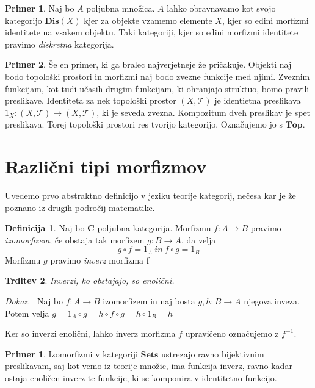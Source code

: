 \documentclass[12pt,a4paper]{book}
\theoremstyle{definition}
\newtheorem{definicija}{Definicija}[chapter]
\theoremstyle{plain}
\newtheorem{trditev}[definicija]{Trditev}
\newenvironment{dokaz}{\emph{Dokaz.}\ }{\hspace{\fill}{$\Box$}}
\theoremstyle{definition}
\newtheorem{primer}{Primer}[section]
\newtheorem*{primer*}{Primer}
\theoremstyle{remark}
\newcommand{\cat}[1]{\textbf{#1}}
\begin{document}
\begin{primer}
Naj bo $A$ poljubna množica. $A$ lahko obravnavamo kot svojo kategorijo $\cat{Dis}(X)$ kjer za objekte vzamemo elemente $X$, kjer so edini morfizmi identitete na vsakem objektu. Taki kategoriji, kjer so edini morfizmi identitete pravimo \emph{diskretna} kategorija.
\end{primer}

\begin{primer}
Še en primer, ki ga bralec najverjetneje že pričakuje. Objekti naj bodo topološki prostori in morfizmi naj bodo zvezne funkcije med njimi. Zveznim funkcijam, kot tudi učasih drugim funkcijam, ki ohranjajo struktuo, bomo pravili preslikave. Identiteta za nek topološki prostor $(X, \mathcal{T})$ je identietna preslikava $1_X : (X, \mathcal{T}) \to (X, \mathcal{T})$, ki je seveda zvezna. Kompozitum dveh preslikav je spet preslikava. Torej topološki prostori res tvorijo kategorijo. Označujemo jo s $\cat{Top}$.
\end{primer}

\section{Različni tipi morfizmov}
Uvedemo prvo abstraktno definicijo v jeziku teorije kategorij, nečesa kar je že poznano iz drugih področij matematike.

\begin{definicija} Naj bo \cat{C} poljubna kategorija. Morfizmu $f : A \to B$ pravimo \emph{izomorfizem}, če obstaja tak morfizem $g : B \to A$, da velja
$$g \circ f = 1_A \ in \ f \circ g = 1_B$$
Morfizmu $g$ pravimo \emph{inverz} morfizma f
\end{definicija}

\begin{trditev} Inverzi, ko obstajajo, so enolični.
\end{trditev}
\begin{dokaz}
Naj bo $f : A \to B$ izomorfizem in naj bosta $g,h: B \to A$ njegova inveza. Potem velja $g = 1_A \circ g = h \circ f \circ g = h \circ 1_B = h$
\end{dokaz}

Ker so inverzi enolični, lahko inverz morfizma $f$ upravičeno označujemo z $f^{-1}$.

\begin{primer*}
Izomorfizmi v kategoriji $\cat{Sets}$ ustrezajo ravno bijektivnim preslikavam, saj kot vemo iz teorije množic, ima funkcija inverz, ravno kadar ostaja enoličen inverz te funkcije, ki se komponira v identitetno funkcijo. 
\end{primer*}
\end{document}

